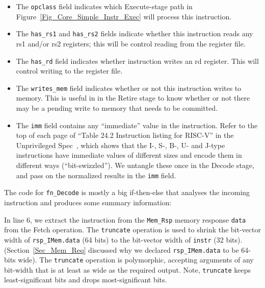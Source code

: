 \begin{itemize}

\item The \verb|opclass| field indicates which Execute-stage path in
      Figure~\ref{Fig_Core_Simple_Instr_Exec} will process this
      instruction.

\item The \verb|has_rs1| and \verb|has_rs2| fields indicate whether
      this instruction reads any rs1 and/or rs2 registers; this will
      be control reading from the register file.

\item The \verb|has_rd| field indicates whether instruction writes an
      rd register.  This will control writing to the register file.

\item The \verb|writes_mem| field indicates whether or not this
      instruction writes to memory.  This is useful in {\FIFE} in the
      Retire stage to know whether or not there may be a pending write
      to memory that needs to be committed.

\item The \verb|imm| field contains any ``immediate'' value in the
      instruction. Refer to the top of each page of ``Table 24.2
      Instruction listing for RISC-V'' in the Unprivileged
      Spec~\cite{RISCV_Unpriv_2019_12_13}, which shows that the I-,
      S-, B-, U- and J-type instructions have immediate values of
      different sizes and encode them in different ways
      (``bit-swizzled'').  We untangle these once in the Decode stage,
      and pass on the normalized results in the \verb|imm| field.

\end{itemize}

The code for \verb|fn_Decode| is mostly a big if-then-else that
analyses the incoming instruction and produces some summary
information:



In line 6, we extract the instruction from the \verb|Mem_Rsp| memory
response \verb|data| from the Fetch operation. The \verb|truncate|
operation is used to shrink the bit-vector width of
\verb|rsp_IMem.data| (64 bits) to the bit-vector width of \verb|instr|
(32 bits).  (Section~\ref{Sec_Mem_Req} discussed why we declared
\verb|rsp_IMem.data| to be 64-bits wide).  The \verb|truncate|
operation is polymorphic, accepting arguments of any bit-width that is
at least as wide as the required output.  Note, \verb|truncate| keeps
least-significant bits and drops most-significant bits.

